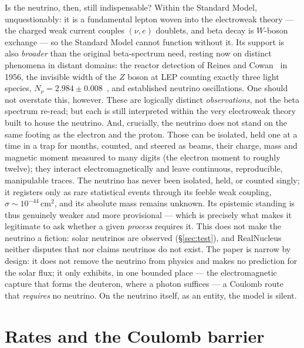 \documentclass[11pt]{article}
\begin{document}
Is the neutrino, then, still indispensable? Within the Standard Model, unquestionably: it is a
fundamental lepton woven into the electroweak theory --- the charged weak current couples $(\nu,e)$
doublets, and beta decay is $W$-boson exchange --- so the Standard Model cannot function without it. Its
support is also \emph{broader} than the original beta-spectrum need, resting now on distinct phenomena
in distant domains: the reactor detection of Reines and Cowan~\cite{ReinesCowan} in 1956, the invisible
width of the $Z$ boson at LEP counting exactly three light species,
$N_\nu=2.984\pm0.008$~\cite{LEP}, and established neutrino oscillations. One should not overstate this,
however. These are logically distinct \emph{observations}, not the beta spectrum re-read; but each is
still interpreted within the very electroweak theory built to house the neutrino. And, crucially, the
neutrino does not stand on the same footing as the electron and the proton. Those can be isolated,
held one at a time in a trap for months, counted, and steered as beams, their charge, mass and
magnetic moment measured to many digits (the electron moment to roughly twelve); they interact
electromagnetically and leave continuous, reproducible, manipulable traces. The neutrino has never been
isolated, held, or counted singly; it registers only as rare statistical events through its feeble weak
coupling, $\sigma\sim10^{-44}\,\mathrm{cm^2}$, and its absolute mass remains unknown. Its epistemic
standing is thus genuinely weaker and more provisional --- which is precisely what makes it legitimate
to ask whether a given \emph{process} requires it. This does not make the neutrino a fiction: solar
neutrinos are observed (\S\ref{sec:test}), and RealNucleus neither disputes that nor claims neutrinos do
not exist. The paper is narrow by design: it does not remove the neutrino from physics and makes no
prediction for the solar flux; it only exhibits, in one bounded place --- the electromagnetic capture
that forms the deuteron, where a photon suffices --- a Coulomb route that \emph{requires} no neutrino.
On the neutrino itself, as an entity, the model is silent.

\section{Rates and the Coulomb barrier}
\end{document}
